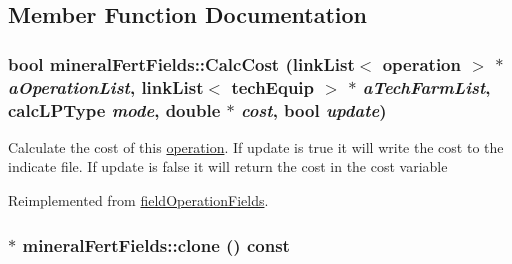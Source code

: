 \subsection{Member Function Documentation}
\hypertarget{classmineral_fert_fields_a9d71379448708130be77ca7166bb99dc}{
\subsubsection[{CalcCost}]{\setlength{\rightskip}{0pt plus 5cm}bool mineralFertFields::CalcCost ({\bf linkList}$<$ {\bf operation} $>$ $\ast$ {\em aOperationList}, \/  {\bf linkList}$<$ {\bf techEquip} $>$ $\ast$ {\em aTechFarmList}, \/  {\bf calcLPType} {\em mode}, \/  double $\ast$ {\em cost}, \/  bool {\em update})}}
\label{classmineral_fert_fields_a9d71379448708130be77ca7166bb99dc}
Calculate the cost of this \hyperlink{classoperation}{operation}. If update is true it will write the cost to the indicate file. If update is false it will return the cost in the cost variable 

Reimplemented from \hyperlink{classfield_operation_fields_aeb2bce9d4612033dbab366d870e432a6}{fieldOperationFields}.\hypertarget{classmineral_fert_fields_a29eb4d8ad0e09942f75f531c8b7c44b6}{
\subsubsection[{clone}]{ $\ast$ mineralFertFields::clone () const}}
\label{classmineral_fert_fields_a29eb4d8ad0e09942f75f531c8b7c44b6}


